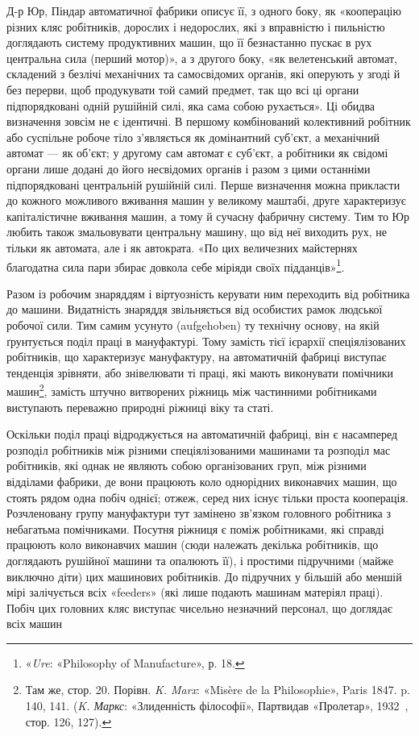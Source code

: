 Д-р Юр, Піндар автоматичної фабрики описує її, з одного
боку, як «кооперацію різних кляс робітників, дорослих і недорослих,
які з вправністю і пильністю доглядають систему продуктивних
машин, що її безнастанно пускає в рух центральна
сила (перший мотор)», а з другого боку, «як велетенський автомат,
складений з безлічі механічних та самосвідомих органів,
які оперують у згоді й без перерви, щоб продукувати той самий
предмет, так що всі ці органи підпорядковані одній рушійній
силі, яка сама собою рухається». Ці обидва визначення зовсім
не є ідентичні. В першому комбінований колективний робітник
або суспільне робоче тіло з’являється як домінантний суб’єкт,
а механічний автомат — як об’єкт; у другому сам автомат є
суб’єкт, а робітники як свідомі органи лише додані до його
несвідомих органів і разом з цими останніми підпорядковані
центральній рушійній силі. Перше визначення можна прикласти
до кожного можливого вживання машин у великому маштабі,
друге характеризує капіталістичне вживання машин, а тому й
сучасну фабричну систему. Тим то Юр любить також змальовувати
центральну машину, що від неї виходить рух, не тільки як
автомата, але і як автократа. «По цих величезних майстернях
благодатна сила пари збирає довкола себе міріяди своїх підданців»\footnote{
«\emph{Ure}: «Philosophy of Manufacture», р. 18.
}.

Разом із робочим знаряддям і віртуозність керувати ним
переходить від робітника до машини. Видатність знаряддя звільняється
від особистих рамок людської робочої сили. Тим самим
усунуто (aufgehoben) ту технічну основу, на якій ґрунтується
поділ праці в мануфактурі. Тому замість тієї ієрархії спеціялізованих
робітників, що характеризує мануфактуру, на автоматичній
фабриці виступає тенденція зрівняти, або знівелювати ті
праці, які мають виконувати помічники машин\footnote{
Там же, стор. 20. Порівн. \emph{K. Marx}: «Misère de la Philosophie»,
Paris 1847. p. 140, 141. (\emph{K. Маркс}: «Злиденність філософії», Партвидав
«Пролетар», 1932~, стор. 126, 127).
}, замість штучно
витворених ріжниць між частинними робітниками виступають
переважно природні ріжниці віку та статі.

Оскільки поділ праці відроджується на автоматичній фабриці,
він є насамперед розподіл робітників між різними спеціялізованими
машинами та розподіл мас робітників, які однак не являють
собою організованих груп, між різними відділами фабрики, де
вони працюють коло однорідних виконавчих машин, що стоять
рядом одна побіч однієї; отжеж, серед них існує тільки проста
кооперація. Розчленовану групу мануфактури тут замінено
зв’язком головного робітника з небагатьма помічниками. Посутня
ріжниця є поміж робітниками, які справді працюють коло виконавчих
машин (сюди належать декілька робітників, що доглядають
рушійної машини та опалюють її), і простими підручними
(майже виключно діти) цих машинових робітників. До підручних
у більшій або меншій мірі залічується всіх «feeders» (які
лише подають машинам матеріял праці). Побіч цих головних кляс
виступає чисельно незначний персонал, що доглядає всіх машин
\parbreak{}  %
